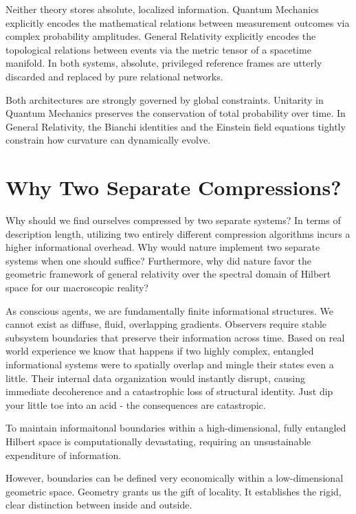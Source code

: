 Neither theory stores absolute, localized information.
Quantum Mechanics explicitly encodes the mathematical relations between measurement outcomes via complex probability amplitudes.
General Relativity explicitly encodes the topological relations between events via the metric tensor of a spacetime manifold.
In both systems, absolute, privileged reference frames are utterly discarded and replaced by pure relational networks.

Both architectures are strongly governed by global constraints.
Unitarity in Quantum Mechanics preserves the conservation of total probability over time.
In General Relativity, the Bianchi identities and the Einstein field equations tightly constrain how curvature can dynamically evolve.


\section{Why Two Separate Compressions?}

Why should we find ourselves compressed by two separate systems? In terms of description length, utilizing two entirely different compression algorithms incurs a higher informational overhead.
Why would nature implement two separate systems when one should suffice? Furthermore, why did nature favor the geometric framework of general relativity over the spectral domain of Hilbert space for our macroscopic reality?

As conscious agents, we are fundamentally finite informational structures. We cannot exist as diffuse, fluid, overlapping gradients.
Observers require stable subsystem boundaries that preserve their information across time.
Based on real world experience we know that happens if two highly complex, entangled informational systems were to spatially overlap and mingle their states even
a little. Their internal data organization would instantly disrupt, causing immediate decoherence and a catastrophic loss of structural identity.
Just dip your little toe into an acid - the consequences are catastropic.

To maintain informaitonal boundaries within a high-dimensional, fully entangled Hilbert space is computationally devastating, requiring an unsustainable expenditure of information.

However, boundaries can be defined very economically within a low-dimensional geometric space.
Geometry grants us the gift of locality.
It establishes the rigid, clear distinction between inside and outside.


